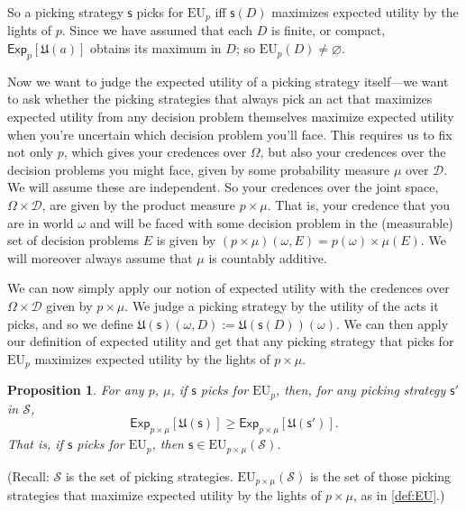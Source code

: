\documentclass[a4paper]{article}
\newtheorem{proposition}[theorem]{Proposition}
\newcommand\Exp{\mathsf{Exp}}
\newcommand\EU{\mathrm{EU}}
\newcommand\U{\mathfrak{U}} %
\newcommand{\D}{\mathcal{D}}
\renewcommand\S{\mathcal{S}}
\newcommand\s{\mathsf{s}}
\newcommand{\todoold}[2][]{\todo[backgroundcolor=white,bordercolor=orange!10,linecolor=gray!10, #1,caption={},textcolor=gray]{Pre-rev: #2}}
\newcommand{\Strategies}{\S}
\renewcommand{\emptyset}{\varnothing}
\renewcommand{\geq}{\geqslant}
\newenvironment{CCM rewritten}
{\begingroup\color{blue}} %
{\endgroup}              %
\begin{document}

So a picking strategy $\s$ picks for $\EU_p$ iff $\s(D)$ maximizes expected utility by the lights of $p$.
Since we have assumed that each $D$ is finite, or compact, $\Exp_p[\U(a)]$ obtains its maximum in $D$; so $\EU_p(D)\neq\emptyset$. 

Now we want to judge the expected utility of a picking strategy itself---we want to ask whether the picking strategies that always pick an act that maximizes expected utility from any decision problem themselves maximize expected utility when you're uncertain which decision problem you'll face. This requires us to fix not only $p$, which gives your credences over $\Omega$, but also your credences over the decision problems you might face, given by some probability measure $\mu$ over $\D$. We will assume these are independent. %
{So your credences over the joint space, $\Omega\times\D$, are given by the product measure $p\times\mu$. That is, your credence that you are in world $\omega$ and will be faced with some decision problem in the (measurable) set of decision problems $E$ is given by $(p\times\mu)(\omega,E)=p(\omega)\times\mu(E)$.} 
We will moreover always assume that $\mu$ is countably additive. 


We can now simply apply our notion of expected utility with the credences over $\Omega\times\D$ given by %
{ $p\times\mu$.} We judge a picking strategy by the utility of the acts it picks, and so we define $\U(\s)(\omega,D):=\U(\s(D))(\omega)$. We can then apply our definition of expected utility and get that any picking strategy that picks for $\EU_p$ maximizes expected utility by the lights of %
{ $p\times\mu$.}
\begin{proposition}\label{thm:eu-self-rec}
	For any $p$, $\mu$, if $\s$ picks for $\EU_p$, then, for any picking strategy $\s'$ in $\S$,
	$$\Exp_{p\times\mu}[\U(\s)]\geq\Exp_{p\times\mu}[\U(\s')].$$
	That is, if $\s$ picks for $\EU_p$, then $\s\in\EU_{p\times\mu}(\Strategies)$. 
	\end{proposition}
(Recall: 
$\Strategies$ is the set of picking strategies. $\EU_{p\times \mu}(\Strategies)$ is the set of those picking strategies that maximize expected utility by the lights of %
{ $p\times\mu$}, as in \cref{def:EU}.)
\end{document}

